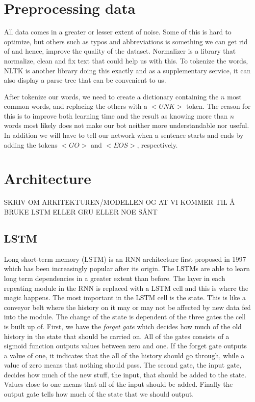 \documentclass{article} %
\begin{document}
\section{Preprocessing data}
All data comes in a greater or lesser extent of noise. Some of this is hard to optimize, but others such as typos and abbreviations is something we can get rid of and hence, improve the quality of the dataset. Normalizer \cite{Normalizer} is a library that normalize, clean and fix text that could help us with this. To tokenize the words, NLTK \cite{NLTK} is another library doing this exactly and as a supplementary service, it can also display a parse tree that can be convenient to us.

After tokenize our words, we need to create a dictionary containing the $n$ most common words, and replacing the others with a $<UNK>$ token. The reason for this is to improve both learning time and the result as knowing more than $n$ words most likely does not make our bot neither more understandable nor useful. In addition we will have to tell our network when a sentence starts and ends by adding the tokens $<GO>$ and $<EOS>$, respectively.

\section{Architecture}

SKRIV OM ARKITEKTUREN/MODELLEN OG AT VI KOMMER TIL Å BRUKE LSTM ELLER GRU ELLER NOE SÅNT

\subsection{LSTM}
Long short-term memory (LSTM) is an RNN architecture first proposed in 1997 \cite{LSTM} which has been increasingly popular after its origin. The LSTMs are able to learn long term dependencies in a greater extent than before. The layer in each repeating module in the RNN is replaced with a LSTM cell and this is where the magic happens. The most important in the LSTM cell is the state. This is like a conveyor belt where the history on it may or may not be affected by new data fed into the module. The change of the state is dependent of the three gates the cell is built up of. First, we have the \textit{forget gate} which decides how much of the old history in the state that should be carried on. All of the gates consists of a sigmoid function outputs values between zero and one. If the forget gate outputs a value of one, it indicates that the all of the history should go through, while a value of zero means that nothing should pass. The second gate, the input gate, decides how much of the new stuff, the input, that should be added to the state. Values close to one means that all of the input should be added. Finally the output gate tells how much of the state that we should output.
\end{document}
